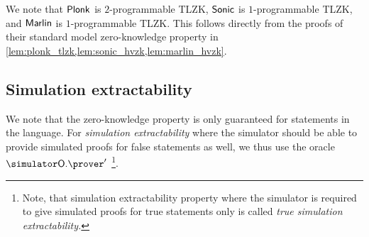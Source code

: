 We note that $\textnormal{\textsf{Plonk}}$ is $2$-programmable TLZK, ${\textnormal{\textsf{Sonic}}}$ is $1$-programmable TLZK,
and ${\textnormal{\textsf{Marlin}}}$ is $1$-programmable TLZK. This follows directly from the proofs of
their standard model zero-knowledge property in
\cref{lem:plonk_tlzk,lem:sonic_hvzk,lem:marlin_hvzk}.

\subsection{Simulation extractability}
We note that the zero-knowledge property is only guaranteed for statements in the
language.
For \emph{simulation extractability} where the simulator
should be able to provide simulated proofs for false statements as well, we thus use the oracle $\simOP'$
\footnote{Note,
  that simulation extractability property where the simulator is required to give
  simulated proofs for true statements only is called \emph{true simulation
    extractability.}}. 
	
